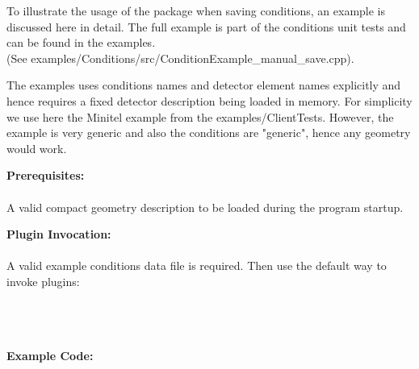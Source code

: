 \documentclass[10pt,a4paper]{article}
\begin{document}
\noindent
To illustrate the usage of the \DDC package when saving conditions,
an example is discussed here in detail.
The full example is part of the conditions unit tests and can be found in the 
\DDH examples.\\
(See examples/Conditions/src/ConditionExample\_manual\_save.cpp).

\noindent
The examples uses conditions names and detector element names explicitly and
hence requires a fixed detector description being loaded in memory.
For simplicity we use here the Minitel example from the examples/ClientTests.
However, the example is very generic and also the conditions are "generic",
hence any geometry would work.


\vspace{0.6cm}

\noindent
{\bf{Prerequisites:}} \\
\\
A valid compact geometry description to be loaded during the program startup.

\vspace{0.6cm}

\noindent
{\bf{Plugin Invocation:}} \\
\\
A valid example conditions data file is required. Then use the default way
to invoke plugins:\\
 \\
 \\
 \\


\vspace{0.6cm}

\noindent
{\bf{Example Code:}} \\
\end{document}
